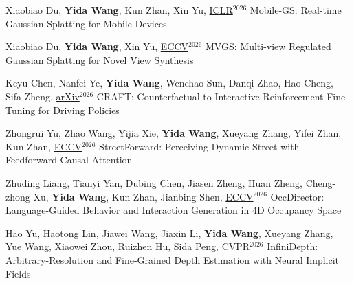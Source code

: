 


\begin{cventries}
\begin{enumerate}[label={[\arabic*]}, leftmargin=*]

\item
\cvpublication
{Xiaobiao Du, \textbf{Yida Wang}, Kun Zhan, Xin Yu, \underline{ICLR}$^{2026}$} %
{Mobile-GS: Real-time Gaussian Splatting for Mobile Devices} %
{} %
{} %

\item
\cvpublication
{Xiaobiao Du, \textbf{Yida Wang}, Xin Yu, \underline{ECCV}$^{2026}$} %
{MVGS: Multi-view Regulated Gaussian Splatting for Novel View Synthesis} %
{} %
{} %

\item
\cvpublication
{Keyu Chen, Nanfei Ye, \textbf{Yida Wang}, Wenchao Sun, Danqi Zhao, Hao Cheng, Sifa Zheng, \underline{arXiv}$^{2026}$} %
{CRAFT: Counterfactual-to-Interactive Reinforcement Fine-Tuning for Driving Policies} %
{} %
{} %

\item
\cvpublication
{Zhongrui Yu, Zhao Wang, Yijia Xie, \textbf{Yida Wang}, Xueyang Zhang, Yifei Zhan, Kun Zhan, \underline{ECCV}$^{2026}$} %
{StreetForward: Perceiving Dynamic Street with Feedforward Causal Attention} %
{} %
{} %

\item
\cvpublication
{Zhuding Liang, Tianyi Yan, Dubing Chen, Jiasen Zheng, Huan Zheng, Cheng-zhong Xu, \textbf{Yida Wang}, Kun Zhan, Jianbing Shen, \underline{ECCV}$^{2026}$} %
{OccDirector: Language-Guided Behavior and Interaction Generation in 4D Occupancy Space} %
{} %
{} %

\item
\cvpublication
{Hao Yu, Haotong Lin, Jiawei Wang, Jiaxin Li, \textbf{Yida Wang}, Xueyang Zhang, Yue Wang, Xiaowei Zhou, Ruizhen Hu, Sida Peng, \underline{CVPR}$^{2026}$} %
{InfiniDepth: Arbitrary-Resolution and Fine-Grained Depth Estimation with Neural Implicit Fields} %
{} %
{} %


\end{enumerate}
\end{cventries}

